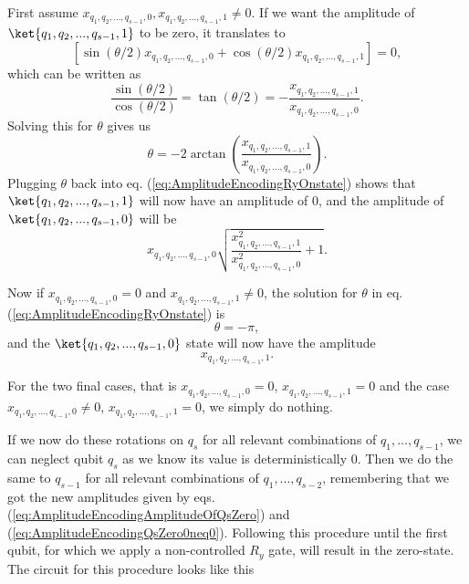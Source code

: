 First assume $x_{q_1,q_2,...,q_{s-1},0}, x_{q_1,q_2,...,q_{s-1},1} \neq 0$.
If we want the amplitude of $ \ket{q_1,q_2,...,q_{s-1},1}$ to be zero, it translates to
$$
[\sin(\theta /2) x_{q_1,q_2,...,q_{s-1},0} + \cos(\theta /2) x_{q_1,q_2,...,q_{s-1},1}] = 0,
$$
which can be written as
$$
\frac{\sin(\theta / 2)}{\cos(\theta / 2)} = \tan(\theta /2) =  - \frac{x_{q_1,q_2,...,q_{s-1},1}}{x_{q_1,q_2,...,q_{s-1},0}}.
$$
Solving this for $\theta$ gives us
\begin{equation}
\label{eq:AmplitudeEncodingTheta}
  \theta = -2 \arctan( \frac{x_{q_1,q_2,...,q_{s-1},1}}{x_{q_1,q_2,...,q_{s-1},0}}). 
\end{equation}
Plugging $\theta$ back into eq. (\ref{eq:AmplitudeEncodingRyOnstate}) shows that $\ket{q_1,q_2,...,q_{s-1},1}$ will now have an amplitude of $0$, and the amplitude of $\ket{q_1,q_2,...,q_{s-1},0}$ will be 
\begin{equation}
    \label{eq:AmplitudeEncodingAmplitudeOfQsZero}
    x_{q_1,q_2,...,q_{s-1},0}\sqrt{\frac{x_{q_1,q_2,...,q_{s-1},1}^2}{x_{q_1,q_2,...,q_{s-1},0}^2} + 1}.
\end{equation}

Now if $x_{q_1,q_2,...,q_{s-1},0} = 0$ and $x_{q_1,q_2,...,q_{s-1},1} \neq 0$, the solution for $\theta$ in eq. (\ref{eq:AmplitudeEncodingRyOnstate}) is 
\begin{equation}
    \label{eq:AmplitudeEncodingTheta0neq0}
    \theta = -\pi,
\end{equation}
and the $\ket{q_1,q_2,...,q_{s-1},0}$ state will now have the amplitude
\begin{equation}
    \label{eq:AmplitudeEncodingQsZero0neq0}
    x_{q_1,q_2,...,q_{s-1},1}.
\end{equation}

For the two final cases, that is $x_{q_1,q_2,...,q_{s-1},0} = 0$, $x_{q_1,q_2,...,q_{s-1},1}=0$
and the case $x_{q_1,q_2,...,q_{s-1},0}\neq0$, $x_{q_1,q_2,...,q_{s-1},1}= 0$, we simply do nothing.

If we now do these rotations on $q_s$ for all relevant combinations of  $q_1,...,q_{s-1}$, we can neglect qubit $q_s$ as we know its value is deterministically 0. Then we do the same to $q_{s-1}$ for all relevant combinations of $q_1,...,q_{s-2}$, remembering that we got the new amplitudes given by eqs. (\ref{eq:AmplitudeEncodingAmplitudeOfQsZero}) and (\ref{eq:AmplitudeEncodingQsZero0neq0}). Following this procedure until the first qubit, for which we apply a non-controlled $R_y$ gate, will result in the zero-state. The circuit for this procedure looks like this

